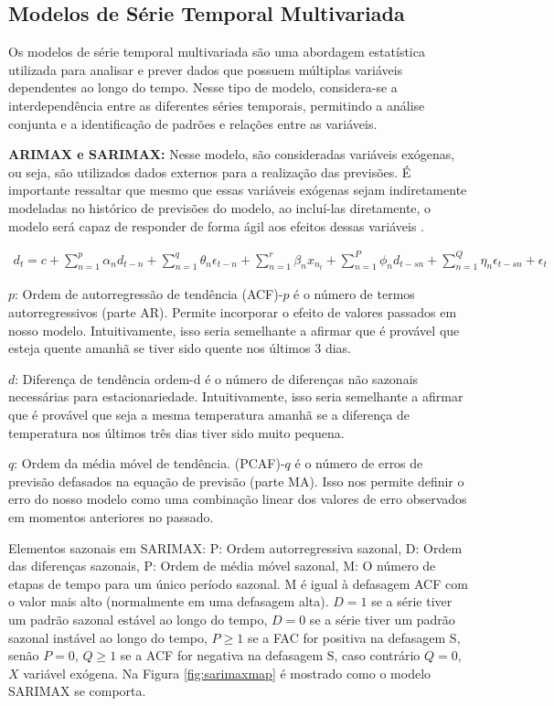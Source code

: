 \subsection{Modelos de S\'erie Temporal Multivariada}\label{subsec:mult}

Os modelos de série temporal multivariada são uma abordagem estatística utilizada para analisar e prever dados que possuem múltiplas variáveis dependentes ao longo do tempo. Nesse tipo de modelo, considera-se a interdependência entre as diferentes séries temporais, permitindo a análise conjunta e a identificação de padrões e relações entre as variáveis. 

\textbf{ARIMAX e SARIMAX:}
Nesse modelo, são consideradas variáveis exógenas, ou seja, são utilizados dados externos para a realização das previsões. É importante ressaltar que mesmo que essas variáveis exógenas sejam indiretamente modeladas no histórico de previsões do modelo, ao incluí-las diretamente, o modelo será capaz de responder de forma ágil aos efeitos dessas variáveis  \cite{sarima}.

\begin{eqnarray}
	d_t=c+\sum_{n=1}^p \alpha_n d_{t-n}+\sum_{n=1}^q \theta_n \epsilon_{t-n}+\sum_{n=1}^r \beta_n x_{n_t}+\sum_{n=1}^P \phi_n d_{t-s n}+\sum_{n=1}^Q \eta_n \epsilon_{t-s n}+\epsilon_t \label{eq:sarmax}
\end{eqnarray}

$p$: Ordem de autorregressão de tendência (ACF)-$p$ é o número de termos autorregressivos (parte AR). Permite incorporar o efeito de valores passados em nosso modelo. Intuitivamente, isso seria semelhante a afirmar que é provável que esteja quente amanhã se tiver sido quente nos últimos 3 dias.

$d$: Diferença de tendência ordem-d é o número de diferenças não sazonais necessárias para estacionariedade. Intuitivamente, isso seria semelhante a afirmar que é provável que seja a mesma temperatura amanhã se a diferença de temperatura nos últimos três dias tiver sido muito pequena.

$q$: Ordem da média móvel de tendência. (PCAF)-$q$ é o número de erros de previsão defasados na equação de previsão (parte MA). Isso nos permite definir o erro do nosso modelo como uma combinação linear dos valores de erro observados em momentos anteriores no passado.

Elementos sazonais em SARIMAX:
P: Ordem autorregressiva sazonal,
D: Ordem das diferenças sazonais,
P: Ordem de média móvel sazonal,
M: O número de etapas de tempo para um único período sazonal.
M é igual à defasagem ACF com o valor mais alto (normalmente em uma defasagem alta).
$D=1$ se a série tiver um padrão sazonal estável ao longo do tempo,
$D=0$ se a série tiver um padrão sazonal instável ao longo do tempo,
$P\geq1$ se a FAC for positiva na defasagem S, senão $P=0$,
$Q\geq1$ se a ACF for negativa na defasagem S, caso contrário $Q=0$,
$X$ variável exógena.
Na Figura \ref{fig:sarimaxmap} é mostrado como o modelo SARIMAX se comporta.



